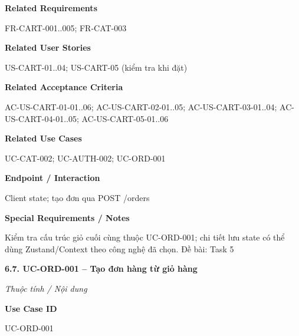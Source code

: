 \documentclass[11pt,a4paper,oneside]{report}
\begin{document}
\par\smallskip\noindent\textcolor{sgublue}{\textbf{Related Requirements}}\par\nobreak
FR-CART-001..005; FR-CAT-003
\par

\par\smallskip\noindent\textcolor{sgublue}{\textbf{Related User Stories}}\par\nobreak
US-CART-01..04; US-CART-05 (kiểm tra khi đặt)
\par

\par\smallskip\noindent\textcolor{sgublue}{\textbf{Related Acceptance Criteria}}\par\nobreak
AC-US-CART-01-01..06; AC-US-CART-02-01..05; AC-US-CART-03-01..04; AC-US-CART-04-01..05; AC-US-CART-05-01..06
\par

\par\smallskip\noindent\textcolor{sgublue}{\textbf{Related Use Cases}}\par\nobreak
UC-CAT-002; UC-AUTH-002; UC-ORD-001
\par

\par\smallskip\noindent\textcolor{sgublue}{\textbf{Endpoint / Interaction}}\par\nobreak
Client state; tạo đơn qua POST /orders
\par

\par\smallskip\noindent\textcolor{sgublue}{\textbf{Special Requirements / Notes}}\par\nobreak
Kiểm tra cấu trúc giỏ cuối cùng thuộc UC-ORD-001; chi tiết lưu state có thể dùng Zustand/Context theo công nghệ đã chọn. \textbar{} Đề bài: Task 5
\par



\textbf{6.7. UC-ORD-001 -- Tạo đơn hàng từ giỏ hàng}



\par\noindent\textit{Thuộc tính / Nội dung}\par

\par\smallskip\noindent\textcolor{sgublue}{\textbf{Use Case ID}}\par\nobreak
UC-ORD-001
\par
\end{document}
